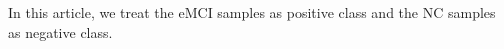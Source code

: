 \documentclass[preprint,12pt]{elsarticle}
\begin{document}
	In this article, we treat the eMCI samples as positive class and the NC samples as negative class.
	
\end{document}
